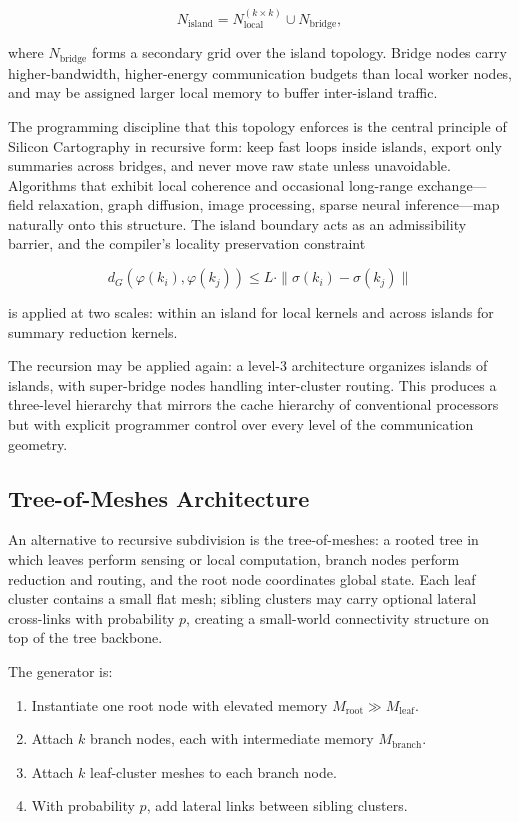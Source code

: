 \documentclass[11pt, a4paper]{article}
\begin{document}
\[
N_{\text{island}} = N_{\text{local}}^{(k \times k)} \cup N_{\text{bridge}},
\]

where $N_{\text{bridge}}$ forms a secondary grid over the island topology. Bridge
nodes carry higher-bandwidth, higher-energy communication budgets than local worker
nodes, and may be assigned larger local memory to buffer inter-island traffic.

The programming discipline that this topology enforces is the central principle of
Silicon Cartography in recursive form: keep fast loops inside islands, export only
summaries across bridges, and never move raw state unless unavoidable. Algorithms
that exhibit local coherence and occasional long-range exchange---field relaxation,
graph diffusion, image processing, sparse neural inference---map naturally onto this
structure. The island boundary acts as an admissibility barrier, and the compiler's
locality preservation constraint

\[
d_G(\varphi(k_i), \varphi(k_j)) \leq L \cdot \|\sigma(k_i) - \sigma(k_j)\|
\]

is applied at two scales: within an island for local kernels and across islands for
summary reduction kernels.

The recursion may be applied again: a level-3 architecture organizes islands of
islands, with super-bridge nodes handling inter-cluster routing. This produces a
three-level hierarchy that mirrors the cache hierarchy of conventional processors
but with explicit programmer control over every level of the communication geometry.

\subsection{Tree-of-Meshes Architecture}

An alternative to recursive subdivision is the tree-of-meshes: a rooted tree in
which leaves perform sensing or local computation, branch nodes perform reduction
and routing, and the root node coordinates global state. Each leaf cluster contains
a small flat mesh; sibling clusters may carry optional lateral cross-links with
probability $p$, creating a small-world connectivity structure on top of the tree backbone.

The generator is:
\begin{enumerate}
  \item Instantiate one root node with elevated memory $M_{\text{root}} \gg M_{\text{leaf}}$.
  \item Attach $k$ branch nodes, each with intermediate memory $M_{\text{branch}}$.
  \item Attach $k$ leaf-cluster meshes to each branch node.
  \item With probability $p$, add lateral links between sibling clusters.
\end{enumerate}
\end{document}
